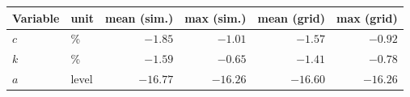 \begin{tabular}{llrrrr}
\toprule
Variable & unit & mean (sim.) & max (sim.) & mean (grid) & max (grid) \\
\midrule
$c$ & \% & $-1.85$ & $-1.01$ & $-1.57$ & $-0.92$ \\
$k$ & \% & $-1.59$ & $-0.65$ & $-1.41$ & $-0.78$ \\
$a$ & level & $-16.77$ & $-16.26$ & $-16.60$ & $-16.26$ \\
\bottomrule
\end{tabular}
